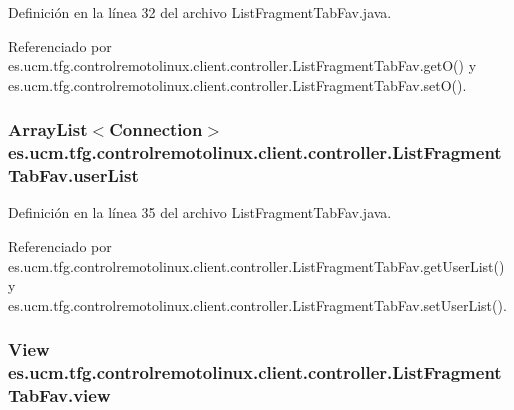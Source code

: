 Definición en la línea 32 del archivo List\-Fragment\-Tab\-Fav.\-java.



Referenciado por es.\-ucm.\-tfg.\-controlremotolinux.\-client.\-controller.\-List\-Fragment\-Tab\-Fav.\-get\-O() y es.\-ucm.\-tfg.\-controlremotolinux.\-client.\-controller.\-List\-Fragment\-Tab\-Fav.\-set\-O().

\hypertarget{classes_1_1ucm_1_1tfg_1_1controlremotolinux_1_1client_1_1controller_1_1ListFragmentTabFav_a6cb5aca93a7ccbca55d49a64794817e6}{
\subsubsection[{user\-List}]{\setlength{\rightskip}{0pt plus 5cm}Array\-List$<${\bf Connection}$>$ es.\-ucm.\-tfg.\-controlremotolinux.\-client.\-controller.\-List\-Fragment\-Tab\-Fav.\-user\-List\hspace{0.3cm}{\ttfamily [private]}}}\label{classes_1_1ucm_1_1tfg_1_1controlremotolinux_1_1client_1_1controller_1_1ListFragmentTabFav_a6cb5aca93a7ccbca55d49a64794817e6}


Definición en la línea 35 del archivo List\-Fragment\-Tab\-Fav.\-java.



Referenciado por es.\-ucm.\-tfg.\-controlremotolinux.\-client.\-controller.\-List\-Fragment\-Tab\-Fav.\-get\-User\-List() y es.\-ucm.\-tfg.\-controlremotolinux.\-client.\-controller.\-List\-Fragment\-Tab\-Fav.\-set\-User\-List().

\hypertarget{classes_1_1ucm_1_1tfg_1_1controlremotolinux_1_1client_1_1controller_1_1ListFragmentTabFav_a3950d582ad9294240404e931f556ed64}{
\subsubsection[{view}]{\setlength{\rightskip}{0pt plus 5cm}View es.\-ucm.\-tfg.\-controlremotolinux.\-client.\-controller.\-List\-Fragment\-Tab\-Fav.\-view\hspace{0.3cm}{\ttfamily [private]}}}\label{classes_1_1ucm_1_1tfg_1_1controlremotolinux_1_1client_1_1controller_1_1ListFragmentTabFav_a3950d582ad9294240404e931f556ed64}



